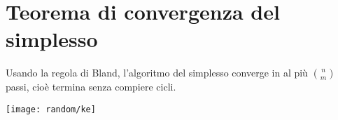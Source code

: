 \documentclass[\main/main.tex]{subfiles}
\begin{document}
\section{Teorema di convergenza del simplesso}

\begin{minipage}{\textwidth}
  \begin{minipage}{.83\textwidth}
    \flushleft
    \begin{theorem}
      Usando la regola di Bland, l'algoritmo del simplesso converge in al più $\binom{n}{m}$ passi, cioè termina senza compiere cicli.
    \end{theorem}
  \end{minipage}\hfill
  \begin{minipage}{0.15\textwidth}\center
    \center
    \texttt{[image: random/ke]}
  \end{minipage}
\end{minipage}
\end{document}
